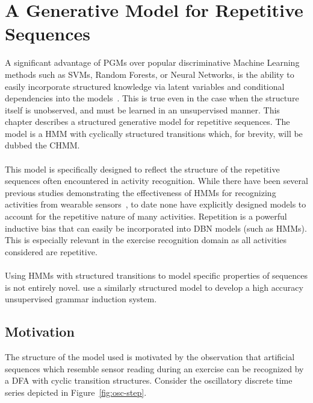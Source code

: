 \documentclass[12pt]{report}
\newcommand{\1}[0]{\mathbbm{1}}
\begin{document}
\chapter{A Generative Model for Repetitive Sequences}
\label{chap: A Generative Model for Repetitive Sequences}
A significant advantage of \acp{PGM} over popular discriminative Machine Learning methods
such as \acp{SVM}, Random Forests, or Neural Networks, is the ability to easily incorporate
structured knowledge via latent variables and conditional dependencies into the
models~\cite{structured-priors,poverty-stimulus,how-to-grow-a-mind}.
This is true even in the case when the structure itself is unobserved, and must
be learned in an unsupervised manner. This chapter describes a structured generative model for
repetitive sequences. The model is a \ac{HMM} with cyclically structured transitions which,
for brevity, will be dubbed the \ac{CHMM}.
\\\\
This model is specifically designed to reflect the structure of the repetitive sequences
often encountered in activity recognition. While there have been several previous studies demonstrating
the effectiveness of \acp{HMM} for recognizing activities from wearable sensors~\cite{hhmm-lee,factored-hmm-tran},
to date none have explicitly designed models to account for the repetitive nature
of many activities. Repetition is a powerful inductive bias that can easily be incorporated into
\ac{DBN} models (such as \acp{HMM}). This is especially relevant in the exercise recognition
domain as all activities considered are repetitive.
\\\\
Using \ac{HMM}s with structured transitions to model specific properties of sequences is
not entirely novel. \cite{cascaded-finite-state} use a similarly structured model to develop
a high accuracy unsupervised grammar induction system.

\section{Motivation}
The structure of the model used is motivated by the observation that artificial
sequences which resemble sensor reading during an exercise can be recognized by a \ac{DFA}
with cyclic transition structures. Consider the oscillatory discrete time series depicted
in Figure~\ref{fig:osc-step}.
\end{document}
